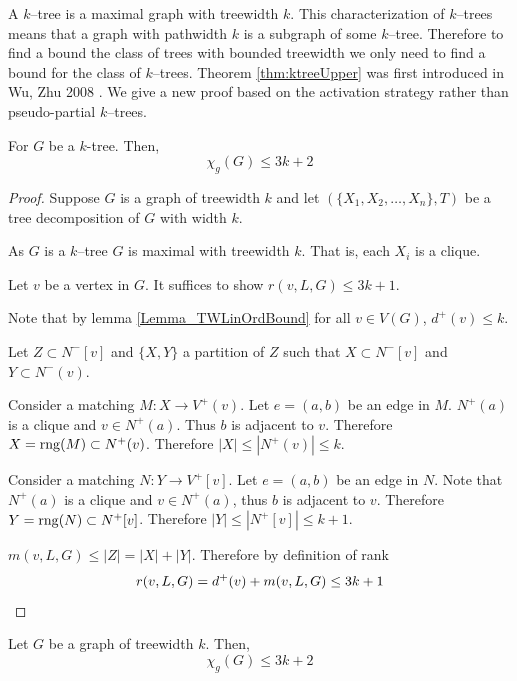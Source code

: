 
A $k$--tree is a maximal graph with treewidth $k$. This characterization of $k$--trees means that a graph with pathwidth $k$ is a subgraph of some $k$--tree. Therefore to find a bound the class of trees with bounded treewidth we only need to find a bound for the class of $k$--trees. Theorem \ref{thm:ktreeUpper} was first introduced in Wu, Zhu 2008 \cite{WuZhu2008}. We give a new proof based on the activation strategy rather than pseudo-partial $k$--trees.
\begin{theorem} \label{thm:ktreeUpper}
         For $G$ be a $k$-tree. Then,  
        \[\chi_g(G) \leq 3k + 2\]
\end{theorem}

\begin{proof}
    Suppose $G$ is a graph of treewidth $k$ and let $(\{X_1,X_2,\dots,X_n\},T)$ be a tree decomposition of $G$ with width $k$.
    
    As $G$ is a $k$--tree $G$ is maximal with treewidth $k$. That is, each $X_i$ is a clique.
    
    Let $v$ be a vertex in $G$. It suffices to show $r(v,L,G) \leq 3k + 1$.
    
    
    Note that by lemma \ref{Lemma_TWLinOrdBound} for all $v \in V(G)$, $d^+(v) \leq k$.
    
    Let $Z \subset N^-[v]$ and $\{X,Y\}$ a partition of $Z$ such that $X\subset N^-[v]$ and $Y\subset N^-(v)$.
           
    Consider a matching $M\colon X \to V^+(v)$. Let $e=(a,b)$ be an edge in $M$.
    $N^+(a)$ is a clique and $v\in N^+(a)$. Thus $b$ is adjacent to $v$. Therefore $X =\operatorname{rng}(M)\subset N^+(v)$. Therefore $|X| \leq |N^+(v)| \leq k$. 
    
    Consider a matching $N\colon Y \to V^+[v]$. Let $e=(a,b)$ be an edge in $N$.
    Note that $N^+(a)$ is a clique and $v\in N^+(a)$, thus $b$ is adjacent to $v$. Therefore $Y =\operatorname{rng}(N)\subset N^+[v]$. Therefore $|Y| \leq |N^+[v]| \leq k+1$. 
        
    $m(v,L,G) \leq |Z| = |X|+|Y|$. Therefore by definition of rank \[r(v,L,G) = d^+(v) + m(v,L,G) \leq 3k +1 \qedhere\]        
\end{proof}

\begin{corollary}
    Let $G$ be a graph of treewidth $k$. Then, 
    \[\chi_g(G) \leq 3k + 2\]
\end{corollary}


